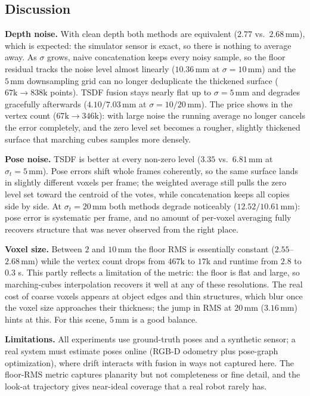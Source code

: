 \documentclass[11pt,a4paper]{article}
\begin{document}
\subsection{Discussion}

\textbf{Depth noise.} With clean depth both methods are equivalent
($2.77$ vs.\ $2.68\,\mathrm{mm}$), which is expected: the simulator sensor is
exact, so there is nothing to average away. As $\sigma$ grows, naive
concatenation keeps every noisy sample, so the floor residual tracks the noise
level almost linearly ($10.36\,\mathrm{mm}$ at $\sigma=10\,\mathrm{mm}$) and
the $5\,\mathrm{mm}$ downsampling grid can no longer deduplicate the thickened
surface ($67\mathrm{k}\to838\mathrm{k}$ points). TSDF fusion stays nearly flat
up to $\sigma=5\,\mathrm{mm}$ and degrades gracefully afterwards
($4.10/7.03\,\mathrm{mm}$ at $\sigma=10/20\,\mathrm{mm}$). The price shows in
the vertex count ($67\mathrm{k}\to346\mathrm{k}$): with large noise the running
average no longer cancels the error completely, and the zero level set becomes
a rougher, slightly thickened surface that marching cubes samples more
densely.

\textbf{Pose noise.} TSDF is better at every non-zero level
($3.35$ vs.\ $6.81\,\mathrm{mm}$ at $\sigma_t=5\,\mathrm{mm}$). Pose errors
shift whole frames coherently, so the same surface lands in slightly different
voxels per frame; the weighted average still pulls the zero level set toward
the centroid of the votes, while concatenation keeps all copies side by side.
At $\sigma_t=20\,\mathrm{mm}$ both methods degrade noticeably
($12.52/10.61\,\mathrm{mm}$): pose error is systematic per frame, and no amount
of per-voxel averaging fully recovers structure that was never observed from
the right place.

\textbf{Voxel size.} Between $2$ and $10\,\mathrm{mm}$ the floor RMS is
essentially constant ($2.55$--$2.68\,\mathrm{mm}$) while the vertex count drops
from $467\mathrm{k}$ to $17\mathrm{k}$ and runtime from $2.8$ to $0.3$ s. This
partly reflects a limitation of the metric: the floor is flat and large, so
marching-cubes interpolation recovers it well at any of these resolutions. The
real cost of coarse voxels appears at object edges and thin structures, which
blur once the voxel size approaches their thickness; the jump in RMS at
$20\,\mathrm{mm}$ ($3.16\,\mathrm{mm}$) hints at this. For this scene,
$5\,\mathrm{mm}$ is a good balance.

\textbf{Limitations.} All experiments use ground-truth poses and a synthetic
sensor; a real system must estimate poses online (RGB-D odometry plus
pose-graph optimization), where drift interacts with fusion in ways not
captured here. The floor-RMS metric captures planarity but not completeness or
fine detail, and the look-at trajectory gives near-ideal coverage that a real
robot rarely has.
\end{document}
